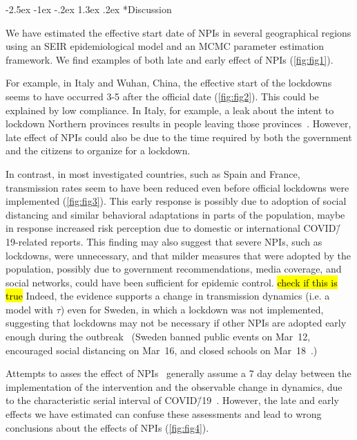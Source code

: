 \documentclass[12pt]{extarticle}
\makeatletter
\renewcommand\section{\@startsection {section}{1}{\z@}%
     {-2.5ex \@plus -1ex \@minus -.2ex}%
     {1.3ex \@plus.2ex}%
    {\Large\bfseries}}
\makeatother
\begin{document}
\pagebreak
\section*{Discussion}

We have estimated the effective start date of NPIs in several geographical regions using an SEIR epidemiological model and an MCMC parameter estimation framework.
We find examples of both late and early effect of NPIs (\autoref{fig:fig1}).

For example, in Italy and Wuhan, China, the effective start of the lockdowns seems to have occurred 3-5 after the official date (\autoref{fig:fig2}). This could be explained by low compliance. In Italy, for example, a leak about the intent to lockdown Northern provinces results in people leaving those provinces~\citep{Gatto2020}. However, late effect of NPIs could also be due to the time required by both the government and the citizens to organize for a lockdown. 
 
In contrast, in most investigated countries, such as Spain and France, transmission rates seem to have been reduced even before official lockdowns were implemented (\autoref{fig:fig3}).
This early response is possibly due to adoption of social distancing and similar behavioral adaptations in parts of the population, maybe in response increased risk perception due to domestic or international COVID\=/19-related reports.
This finding may also suggest that severe NPIs, such as lockdowns, were unnecessary, and that milder measures that were adopted by the population, possibly due to government recommendations, media coverage, and social networks, could have been sufficient for epidemic control.
\hl{check if this is true} Indeed, the evidence supports a change in transmission dynamics (i.e. a model with $\tau$) even for Sweden, in which a lockdown was not implemented, suggesting that lockdowns may not be necessary if other NPIs are adopted early enough during the outbreak~\citep{Banholzer2020} (Sweden banned public events on Mar~12, encouraged social distancing on Mar~16, and closed schools on Mar~18~\citep{Flaxman2020}.)

Attempts to asses the effect of NPIs~\citep{Flaxman2020,Banholzer2020} generally assume a 7 day delay between the implementation of the intervention and the observable change in dynamics, due to the characteristic serial interval of COVID\=/19~\citep{Gatto2020}.
However, the late and early effects we have estimated can confuse these assessments and lead to wrong conclusions about the effects of NPIs (\autoref{fig:fig4}). 
\end{document}
